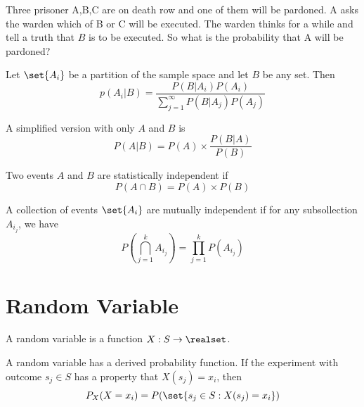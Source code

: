 \begin{example}[3 choose 1]
    Three prisoner A,B,C are on death row and one of them will be pardoned. A asks the warden which of B or C will be executed. The warden thinks for a while and tell a truth that $B$ is to be executed. So what is the probability that A will be pardoned?
\end{example}

\begin{theorem}
    Let $\set{A_i}$ be a partition of the sample space and let $B$ be any set. Then
    \begin{equation}
        p(A_i|B) = \frac{P(B|A_i)P(A_i)}{\displaystyle \sum_{j=1}^\infty P(B|A_j)P(A_j)}
    \end{equation}
    
    A simplified version with only $A$ and $B$ is
    \begin{equation}
        P(A|B) = P(A) \times \frac{P(B|A)}{P(B)}
    \end{equation}
\end{theorem}

\begin{definition}
    Two events $A$ and $B$ are statistically independent if
    \begin{equation}
        P(A \cap B) = P(A) \times P(B)
    \end{equation}
\end{definition}

\begin{definition}
    A collection of events $\set{A_i}$ are mutually independent if for any subsollection $A_{i_j}$, we have
    \begin{equation}
        P\left( \bigcap_{j=1}^k A_{i_j} \right) = \prod_{j=1}^k P(A_{i_j})
    \end{equation}
\end{definition}



\section{Random Variable}


\begin{definition}
    A random variable is a function $X: S \rightarrow \realset$. 
\end{definition}

A random variable has a derived probability function. If the experiment with outcome $s_j \in S$ has a property that $X(s_j) = x_i$, then
\begin{equation}
    P_X(X=x_i) = P(\set{s_j \in S: X(s_j) = x_i})
\end{equation}

